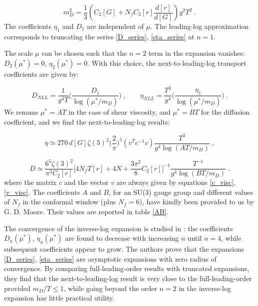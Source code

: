  \begin{equation}
 m_D^2 =  \frac{1}{3} \left(C_2[G] + N_f C_2[r]\frac{d[r]}{d[G]}  \right)g^2 T^2 \; .
\label{Debye_mass} 
\end{equation}
%
The coefficients $\eta_1$ and $D_1$ are independent of $\mu$. The leading-log approximation corresponds to truncating the series \ref{D_series}, \ref{eta_series} at $n=1$.

The scale $\mu$ can be chosen such that the $n=2$ term in the expansion vanishes: $D_2(\mu^*) = 0$, $\eta_2(\mu^*) =0$. With this choice, the next-to-leading-log transport coefficients are given by:

\begin{equation}
D_{NLL} = \frac{1}{g^4 T} \biggl( \frac{D_1}{ \log(\mu^*/m_D)} \biggr) \: , \qquad
\eta_{NLL} = \frac{T^3}{g^4} \biggl( \frac{\eta_1}{ \log(\mu^*/m_D)} \biggr) \: .
\end{equation} 
%
We rename $\mu^* = AT$ in the case of shear viscosity, and $\mu^* = BT$ for the diffusion coefficient, and we find the next-to-leading-log results:

 \begin{equation}   
\eta \simeq 270 \, d [G] \zeta(5)^2 \biggl( \frac{2}{\pi} \biggr)^5 (v^T c^{-1} v) \frac{T^3}{g^4 \log( AT/m_D)} \; ,
\label{eta_NLL}
\end{equation}

\begin{equation}
D \simeq \frac{6^5 \zeta(3)^2}{\pi^3 C_2[r]} \biggl[ 4 N_f T[r] + 4 N + \frac{3 \pi^2}{8} C_2[r] \biggr]^{-1} 
 \frac{T^{-1}}{g^4\log(BT/m_D)} \;.
 \label{D_NLL}
\end{equation}
%
where the matrix $c$ and the vector $v$ are always given by equations \ref{c_visc}, \ref{v_visc}. The coefficients $A$ and $B$, for an SU(3) gauge group and different values of $N_f$ in the conformal window (plus $N_f = 6$), have kindly been provided to us by G. D. Moore. Their values are reported in table \ref{AB}.

The convergence of the inverse-log expansion is studied in \cite{Arnold:2003zc}: the coefficients $D_n(\mu^*)$, $\eta_n(\mu^*)$ are found to decrease with increasing $n$ until $n=4$, while subsequent coefficients appear to grow. The authors prove that the expansions \ref{D_series}, \ref{eta_series} are asymptotic expansions with zero radius of convergence. By comparing full-leading-order results with truncated expansions, they find that the next-to-leading-log result is very close to the full-leading-order provided $m_D/T \leq 1$, while going beyond the order $n=2$ in the inverse-log expansion has little practical utility.

